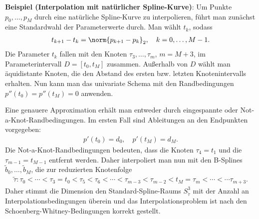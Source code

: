 \linie
\pagebreak

\textbf{Beispiel (Interpolation mit natürlicher Spline-Kurve)}:
Um Punkte $p_0, \dotsc, p_M$ durch eine natürliche Spline-Kurve zu interpolieren,
führt man zunächst eine Standardwahl der Parameterwerte durch.
Man wählt $t_k$, sodass
\begin{align*}
    t_{k+1} - t_k = \norm{p_{k+1} - p_k}_2,\quad
    k = 0, \dotsc, M - 1.
\end{align*}
Die Parameter $t_k$ fallen mit den Knoten $\tau_3, \dotsc, \tau_m$, $m = M + 3$,
im Parameterintervall $D = [t_0, t_M]$ zusammen.
Außerhalb von $D$ wählt man äquidistante Knoten, die den Abstand des ersten bzw. letzten
Knotenintervalls erhalten.
Nun kann man das univariate Schema mit den Randbedingungen $p''(t_0) = p''(t_M) = 0$ anwenden.

Eine genauere Approximation erhält man entweder durch eingespannte oder
Not-a-Knot-Rand\-bedingungen.
Im ersten Fall sind Ableitungen an den Endpunkten vorgegeben:
\begin{align*}
    p'(t_0) = d_0,\quad p'(t_M) = d_M.
\end{align*}
Die Not-a-Knot-Randbedingungen bedeuten, dass die Knoten $\tau_4 = t_1$ und die
$\tau_{m-1} = t_{M-1}$ entfernt werden.
Daher interpoliert man nun mit den B-Splines $\widetilde{b}_0, \dotsc, \widetilde{b}_M$,
die zur reduzierten Knotenfolge
\begin{align*}
    \widetilde{\tau}\colon
    \tau_0 < \dotsb < \tau_3 = t_0 < \tau_5 < \tau_6 < \dotsb < \tau_{m-3} < \tau_{m-2} <
    t_M = \tau_m < \dotsb < \dotsb \tau_{m+3}.
\end{align*}
Daher stimmt die Dimension den Standard-Spline-Raums $S_{\widetilde{\tau}}^3$ mit der
Anzahl an Interpolationsbedingungen überein und das Interpolationsproblem ist nach
den Schoenberg-Whitney-Bedingungen korrekt gestellt.

\pagebreak

